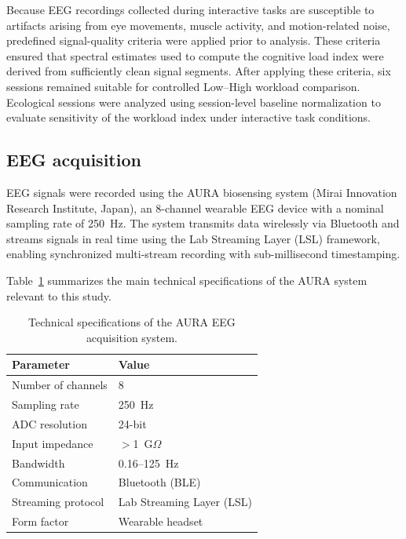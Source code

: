 \documentclass[10pt]{iopart}
\begin{document}
Because EEG recordings collected during interactive tasks are
susceptible to artifacts arising from eye movements, muscle
activity, and motion-related noise, predefined signal-quality
criteria were applied prior to analysis. These criteria ensured
that spectral estimates used to compute the cognitive load index
were derived from sufficiently clean signal segments. After
applying these criteria, six sessions remained suitable for
controlled Low--High workload comparison. Ecological sessions
were analyzed using session-level baseline normalization to
evaluate sensitivity of the workload index under interactive
task conditions.

\subsection{EEG acquisition}

EEG signals were recorded using the AURA biosensing system
(Mirai Innovation Research Institute, Japan), an 8-channel
wearable EEG device with a nominal sampling rate of 250~Hz.
The system transmits data wirelessly via Bluetooth and streams
signals in real time using the Lab Streaming Layer (LSL)
framework, enabling synchronized multi-stream recording with
sub-millisecond timestamping.

Table~\ref{tab:aura_specs} summarizes the main technical
specifications of the AURA system relevant to this study.

\begin{table}[t]
\centering
\caption{Technical specifications of the AURA EEG acquisition system.}
\label{tab:aura_specs}
\small
\setlength{\tabcolsep}{10pt}
\begin{tabular}{ll}
\toprule
\textbf{Parameter} & \textbf{Value} \\
\midrule
Number of channels       & 8 \\
Sampling rate            & 250~Hz \\
ADC resolution           & 24-bit \\
Input impedance          & $>$1~G$\Omega$ \\
Bandwidth                & 0.16--125~Hz \\
Communication            & Bluetooth (BLE) \\
Streaming protocol       & Lab Streaming Layer (LSL) \\
Form factor              & Wearable headset \\
\bottomrule
\end{tabular}
\end{table}
\end{document}
